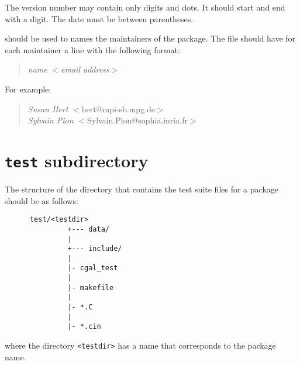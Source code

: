 \begin{description}
       The version number may contain only digits and dots. It should start and 
       end with a digit. The date must be between parentheses.
  \item[\ccAnchor{example/maintainer}{{\tt maintainer}}]%
       should be used to names the maintainers of the package. The file should
       have for each maintainer a line with the following format:
       \begin{verse}
       {\it name} $<${\it email address}$>$\\
       \end{verse}
       For example:
       \begin{verse}
       {\it Susan Hert} $<$hert@mpi-sb.mpg.de$>$\\
       {\it Sylvain Pion} $<$Sylvain.Pion@sophia.inria.fr$>$\\
       \end{verse}
\end{description}

\section{{\tt test} subdirectory}
\label{sec:test_subdirectory}

The structure of the directory that contains the test suite files for 
a package should be as follows: 

\begin{verbatim}
      test/<testdir>
               +--- data/
               |
               +--- include/
               |
               |- cgal_test
               |
               |- makefile
               |
               |- *.C
               |
               |- *.cin
\end{verbatim}
where the directory \verb|<testdir>| has a name that corresponds to the package
name.

